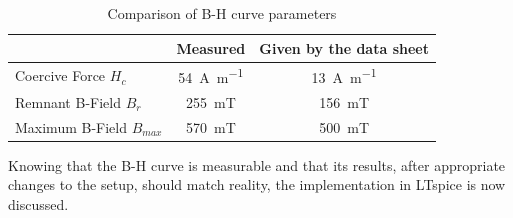 \begin{table}[H]
    \centering
    \caption{Comparison of B-H curve parameters \cite{ferroxcubeProductSpecificationsCore2016}}
    \begin{tabular}{|l|c|c|}
        \hline
        & Measured & Given by the data sheet \\
        \hline
        Coercive Force $H_c$ & \SI{54}{\A\per\m} & \SI{13}{\A\per\m}\\ 
        \hline
        Remnant B-Field $B_r$ & \SI{255}{\milli\tesla} & \SI{156}{\milli\tesla}\\
        \hline
        Maximum B-Field $B_{max}$ & \SI{570}{\milli\tesla} & \SI{500}{\milli\tesla}\\
        \hline
    \end{tabular}
    \label{tab:B-H_curve_points_of_interest_comparison}
\end{table}
Knowing that the B-H curve is measurable and that its results, after appropriate changes to the setup, should match reality, the implementation in LTspice is now discussed.
